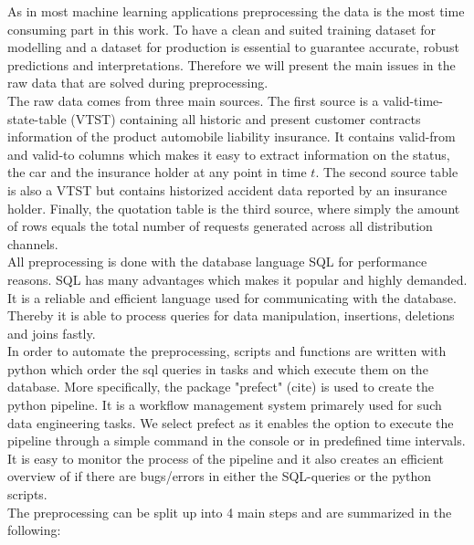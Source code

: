 \documentclass[12pt,titlepage]{article}
\begin{document}
As in most machine learning applications preprocessing the data is the most time consuming part in this work. To have a clean and suited training dataset for modelling and a dataset for production is essential to guarantee accurate, robust predictions and interpretations. Therefore we will present the main issues in the raw data that are solved during preprocessing. \\
The raw data comes from three main sources. The first source is a valid-time-state-table (VTST) containing all historic and present customer contracts information of the product automobile liability insurance. It contains valid-from and valid-to columns which makes it easy to extract information on the status, the car and the insurance holder at any point in time $t$. The second source table is also a VTST but contains historized accident data reported by an insurance holder. Finally, the quotation table is the third source, where simply the amount of rows equals the total number of requests generated across all distribution channels. \\
All preprocessing is done with the database language SQL for performance reasons. SQL has many advantages which makes it popular and highly demanded. It is a reliable and efficient language used for communicating with the database. Thereby it is able to process queries for data manipulation, insertions, deletions and joins fastly. \\
In order to automate the preprocessing, scripts and functions are written with python which order the sql queries in tasks and which execute them on the database. More specifically, the package "prefect" (cite) is used to create the python pipeline. It is a workflow management system primarely used for such data engineering tasks. We select prefect as it enables the option to execute the pipeline through a simple command in the console or in predefined time intervals. It is easy to monitor the process of the pipeline and it also creates an efficient overview of if there are bugs/errors in either the SQL-queries or the python scripts. \\
The preprocessing can be split up into 4 main steps and are summarized in the following: \\
\end{document}
